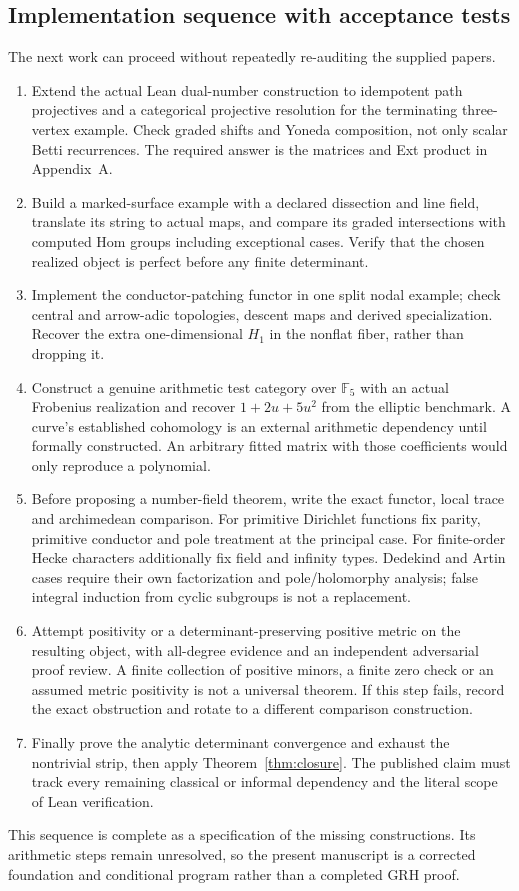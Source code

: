 \subsection{Implementation sequence with acceptance tests}
The next work can proceed without repeatedly re-auditing the supplied papers.
\begin{enumerate}
\item Extend the actual Lean dual-number construction to idempotent path projectives and a categorical projective resolution for the terminating three-vertex example. Check graded shifts and Yoneda composition, not only scalar Betti recurrences. The required answer is the matrices and Ext product in Appendix~A.
\item Build a marked-surface example with a declared dissection and line field, translate its string to actual maps, and compare its graded intersections with computed Hom groups including exceptional cases. Verify that the chosen realized object is perfect before any finite determinant.
\item Implement the conductor-patching functor in one split nodal example; check central and arrow-adic topologies, descent maps and derived specialization. Recover the extra one-dimensional $H_1$ in the nonflat fiber, rather than dropping it.
\item Construct a genuine arithmetic test category over $\mathbb F_5$ with an actual Frobenius realization and recover $1+2u+5u^2$ from the elliptic benchmark. A curve's established cohomology is an external arithmetic dependency until formally constructed. An arbitrary fitted matrix with those coefficients would only reproduce a polynomial.
\item Before proposing a number-field theorem, write the exact functor, local trace and archimedean comparison. For primitive Dirichlet functions fix parity, primitive conductor and pole treatment at the principal case. For finite-order Hecke characters additionally fix field and infinity types. Dedekind and Artin cases require their own factorization and pole/holomorphy analysis; false integral induction from cyclic subgroups is not a replacement.
\item Attempt positivity or a determinant-preserving positive metric on the resulting object, with all-degree evidence and an independent adversarial proof review. A finite collection of positive minors, a finite zero check or an assumed metric positivity is not a universal theorem. If this step fails, record the exact obstruction and rotate to a different comparison construction.
\item Finally prove the analytic determinant convergence and exhaust the nontrivial strip, then apply Theorem~\ref{thm:closure}. The published claim must track every remaining classical or informal dependency and the literal scope of Lean verification.
\end{enumerate}
This sequence is complete as a specification of the missing constructions. Its arithmetic steps remain unresolved, so the present manuscript is a corrected foundation and conditional program rather than a completed GRH proof.

